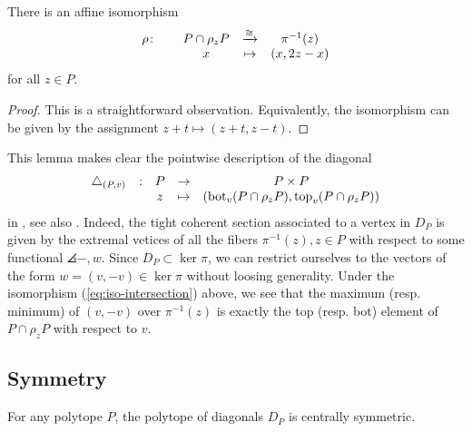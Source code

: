 \begin{lemma}
	There is an affine isomorphism
	\begin{equation} \label{eq:iso-intersection}
		\begin{matrix}
			\rho \colon & & P \cap \rho_z P & \xrightarrow{\cong} & \pi^{-1}(z) \\
			& & x & \mapsto & (x,2z-x)
		\end{matrix}
	\end{equation}
	for all $z \in P$.
\end{lemma}

\begin{proof}
	This is a straightforward observation.
	Equivalently, the isomorphism can be given by the assignment $z+t \mapsto (z+t,z-t)$.
\end{proof}

This lemma makes clear the pointwise description of the diagonal
\begin{equation*}
	\begin{matrix}
		\triangle_{(P,v)} & : & P & \to & P \times P \\
		& & z & \mapsto & (\operatorname{bot}_v(P \cap \rho_z P),\operatorname{top}_v(P \cap \rho_z P))
	\end{matrix}
\end{equation*}
in \cite[Definition 10]{MTTV19}, see also \cite[Proposition 1.15]{GLA21}.
Indeed, the tight coherent section associated to a vertex in $D_P$ is given by the extremal vetices of all the fibers $\pi^{-1}(z), z \in P$ with respect to some functional $\angles{-,w}$.
Since $D_P \subset \ker \pi$, we can restrict ourselves to the vectors of the form $w=(v,-v) \in \ker \pi$ without loosing generality.
Under the isomorphism (\ref{eq:iso-intersection}) above, we see that the maximum (resp. minimum) of $(v,-v)$ over $\pi^{-1}(z)$ is exactly the top (resp. bot) element of $P\cap \rho_z P$ with respect to $v$.

\subsection{Symmetry}

\begin{lemma}
	For any polytope $P$, the polytope of diagonals $D_P$ is centrally symmetric.
\end{lemma}

